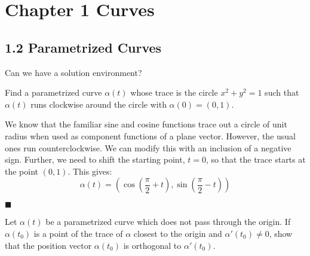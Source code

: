 \documentclass[12pt]{article}
\renewcommand{\qed}{\hfill$\blacksquare$}
\renewenvironment{proof}{\begin{addmargin}[1em]{0em}\begin{newproof}}{\end{newproof}\end{addmargin}\qed}
\newenvironment{problem}[2][Exercise]{\begin{trivlist}
\item[\hskip \labelsep {\bfseries #1}\hskip \labelsep {\bfseries #2.}]}{\end{trivlist}}
\begin{document}

\rhead{\today}



\section*{Chapter 1 Curves}

\subsection*{1.2 Parametrized Curves}
Can we have a solution environment?
\begin{problem}{1.2.1}
Find a parametrized curve $\alpha\left(t\right)$ whose trace is the circle $x^2+y^2=1$ such that $\alpha\left(t\right)$ runs clockwise around the circle with $\alpha\left(0\right)=\left(0,1\right)$.
\end{problem}
\begin{proof}
We know that the familiar sine and cosine functions trace out a circle of unit radius when used as component functions of a plane vector. However, the usual ones run counterclockwise. We can modify this with an inclusion of a negative sign. Further, we need to shift the starting point, $t=0$, so that the trace starts at the point $\left(0,1\right)$. This gives:
\[ \alpha\left(t\right) = \left(\cos \left(\frac{\pi}{2}+t\right), \sin \left(\frac{\pi}{2} - t \right)\right) \]
\end{proof}


\begin{problem}{1.2.2}
Let $\alpha\left(t\right)$ be a parametrized curve which does not pass through the origin. If $\alpha\left(t_0\right)$ is a point of the trace of $\alpha$ closest to the origin and $\alpha'\left(t_0\right)\neq 0$, show that the position vector $\alpha\left(t_0\right)$ is orthogonal to $\alpha'\left(t_0\right)$.
\end{problem}
\end{document}
